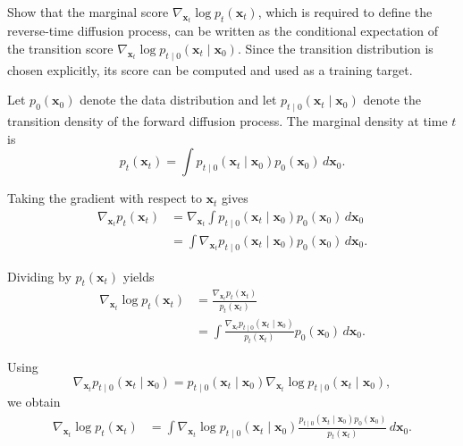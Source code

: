 \begin{compactproof}[title={Proof}]
Show that the marginal score $\nabla_{\mathbf{x}_t}\log p_t(\mathbf{x}_t)$, which is required to define the reverse-time diffusion process, can be written as the conditional expectation of the transition score
$\nabla_{\mathbf{x}_t}\log p_{t\mid 0}(\mathbf{x}_t\mid \mathbf{x}_0)$.
Since the transition distribution is chosen explicitly, its score can be computed and used as a training target.

Let $p_0(\mathbf{x}_0)$ denote the data distribution and let
$p_{t\mid 0}(\mathbf{x}_t\mid \mathbf{x}_0)$ denote the transition density of the forward diffusion process. The marginal density at time $t$ is
\begin{equation*}
p_t(\mathbf{x}_t)
=
\int
p_{t\mid 0}(\mathbf{x}_t\mid \mathbf{x}_0)
p_0(\mathbf{x}_0)
\,d\mathbf{x}_0.
\end{equation*}

Taking the gradient with respect to $\mathbf{x}_t$ gives
\begin{align*}
\nabla_{\mathbf{x}_t}p_t(\mathbf{x}_t)
&=
\nabla_{\mathbf{x}_t}
\int
p_{t\mid 0}(\mathbf{x}_t\mid \mathbf{x}_0)
p_0(\mathbf{x}_0)
\,d\mathbf{x}_0
\\
&=
\int
\nabla_{\mathbf{x}_t}
p_{t\mid 0}(\mathbf{x}_t\mid \mathbf{x}_0)
p_0(\mathbf{x}_0)
\,d\mathbf{x}_0.
\end{align*}

Dividing by $p_t(\mathbf{x}_t)$ yields
\begin{align*}
\nabla_{\mathbf{x}_t}\log p_t(\mathbf{x}_t)
&=
\frac{
\nabla_{\mathbf{x}_t}p_t(\mathbf{x}_t)
}{
p_t(\mathbf{x}_t)
}
\\
&=
\int
\frac{
\nabla_{\mathbf{x}_t}
p_{t\mid 0}(\mathbf{x}_t\mid \mathbf{x}_0)
}{
p_t(\mathbf{x}_t)
}
p_0(\mathbf{x}_0)
\,d\mathbf{x}_0.
\end{align*}

Using
\begin{equation*}
\nabla_{\mathbf{x}_t}
p_{t\mid 0}(\mathbf{x}_t\mid \mathbf{x}_0)
=
p_{t\mid 0}(\mathbf{x}_t\mid \mathbf{x}_0)
\nabla_{\mathbf{x}_t}
\log p_{t\mid 0}(\mathbf{x}_t\mid \mathbf{x}_0),
\end{equation*}
we obtain
\begin{align*}
\nabla_{\mathbf{x}_t}\log p_t(\mathbf{x}_t)
&=
\int
\nabla_{\mathbf{x}_t}
\log p_{t\mid 0}(\mathbf{x}_t\mid \mathbf{x}_0)
\frac{
p_{t\mid 0}(\mathbf{x}_t\mid \mathbf{x}_0)
p_0(\mathbf{x}_0)
}{
p_t(\mathbf{x}_t)
}
\,d\mathbf{x}_0.
\end{align*}


\end{compactproof}
